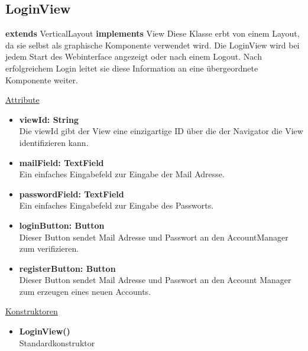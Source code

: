 \newpage
\subsection{LoginView}
\textbf{extends}  VerticalLayout \newline
\textbf{implements} View \newline
Diese Klasse erbt von einem Layout, da sie selbst als graphische Komponente verwendet wird. Die LoginView wird bei jedem Start des Webinterface angezeigt oder nach einem Logout. Nach erfolgreichem Login leitet sie diese Information an eine übergeordnete Komponente weiter.
\newline

\underline{Attribute}
\begin{itemize}
\itemsep0pt
\item \textbf{viewId: String} \hfill\\ 
Die viewId gibt der View eine einzigartige ID über die der Navigator die View identifizieren kann.

\item \textbf{mailField: TextField} \hfill\\ 
Ein einfaches Eingabefeld zur Eingabe der Mail Adresse.

\item \textbf{passwordField: TextField} \hfill\\
Ein einfaches Eingabefeld zur Eingabe des Passworts.

\item \textbf{loginButton: Button} \hfill\\
Dieser Button sendet Mail Adresse und Passwort an den AccountManager zum verifizieren.

\item \textbf{registerButton: Button} \hfill\\
Dieser Button sendet Mail Adresse und Passwort an den Account Manager zum erzeugen eines neuen Accounts.

\end{itemize}

\underline{Konstruktoren}
\begin{itemize}
\itemsep0pt
\item \textbf{LoginView()} \hfill\\
Standardkonstruktor
\end{itemize}

